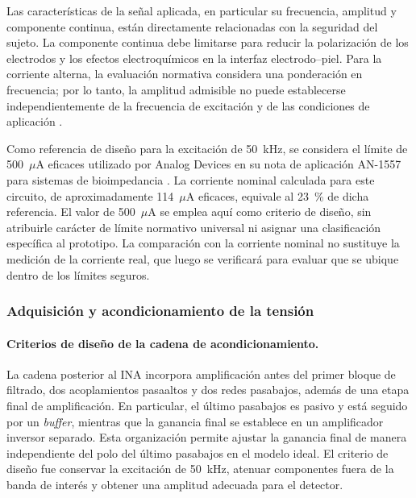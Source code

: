 \documentclass[12pt,a4paper]{article}
\begin{document}
Las características de la señal aplicada, en particular su frecuencia, amplitud y componente continua,
están directamente relacionadas con la seguridad del sujeto. La componente continua debe limitarse
para reducir la polarización de los electrodos y los efectos electroquímicos en la interfaz
electrodo--piel. Para la corriente alterna, la evaluación normativa considera una ponderación en
frecuencia; por lo tanto, la amplitud admisible no puede establecerse independientemente de la
frecuencia de excitación y de las condiciones de aplicación \cite{iec60601}.

Como referencia de diseño para la excitación de 50~kHz, se considera el límite de
500~$\mu$A eficaces utilizado por Analog Devices en su nota de aplicación AN-1557 para sistemas de
bioimpedancia \cite{analog_an1557}. La corriente nominal calculada para este circuito,
de aproximadamente 114~$\mu$A eficaces, equivale al 23~\% de dicha referencia.
El valor de 500~$\mu$A se emplea aquí como criterio de diseño, sin atribuirle carácter de límite
normativo universal ni asignar una clasificación específica al prototipo. La comparación con la corriente
nominal no sustituye la medición de la corriente real, que luego se verificará para evaluar que se ubique 
dentro de los límites seguros. 


\subsubsection{Adquisición y acondicionamiento de la tensión}

\paragraph{Criterios de diseño de la cadena de acondicionamiento.}
La cadena posterior al INA incorpora amplificación antes del primer bloque de filtrado,
dos acoplamientos pasaaltos y dos redes pasabajos, además de una etapa final de amplificación.
En particular, el último pasabajos es pasivo y está seguido por un \textit{buffer}, mientras que la
ganancia final se establece en un amplificador inversor separado. Esta organización permite
ajustar la ganancia final de manera independiente del polo del último pasabajos en el modelo
ideal. El criterio de diseño fue conservar la excitación de 50~kHz, atenuar componentes fuera
de la banda de interés y obtener una amplitud adecuada para el detector.
\end{document}

